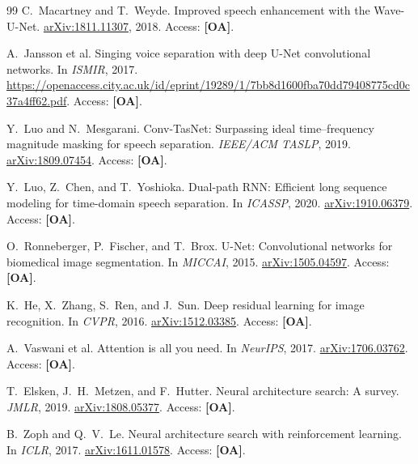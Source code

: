 \documentclass[10pt,twocolumn,letterpaper]{article}
\begin{document}
{\begin{thebibliography}{99}
C.~Macartney and T.~Weyde.
\newblock Improved speech enhancement with the Wave-U-Net.
\newblock \href{https://arxiv.org/abs/1811.11307}{arXiv:1811.11307}, 2018.
\newblock Access: \textbf{[OA]}.

A.~Jansson et al.
\newblock Singing voice separation with deep U-Net convolutional networks.
\newblock In \emph{ISMIR}, 2017.
\newblock \url{https://openaccess.city.ac.uk/id/eprint/19289/1/7bb8d1600fba70dd79408775cd0c37a4ff62.pdf}.
\newblock Access: \textbf{[OA]}.

Y.~Luo and N.~Mesgarani.
\newblock Conv-TasNet: Surpassing ideal time--frequency magnitude masking for speech separation.
\newblock \emph{IEEE/ACM TASLP}, 2019.
\newblock \href{https://arxiv.org/abs/1809.07454}{arXiv:1809.07454}.
\newblock Access: \textbf{[OA]}.

Y.~Luo, Z.~Chen, and T.~Yoshioka.
\newblock Dual-path RNN: Efficient long sequence modeling for time-domain speech separation.
\newblock In \emph{ICASSP}, 2020.
\newblock \href{https://arxiv.org/abs/1910.06379}{arXiv:1910.06379}.
\newblock Access: \textbf{[OA]}.

O.~Ronneberger, P.~Fischer, and T.~Brox.
\newblock U-Net: Convolutional networks for biomedical image segmentation.
\newblock In \emph{MICCAI}, 2015.
\newblock \href{https://arxiv.org/abs/1505.04597}{arXiv:1505.04597}.
\newblock Access: \textbf{[OA]}.

K.~He, X.~Zhang, S.~Ren, and J.~Sun.
\newblock Deep residual learning for image recognition.
\newblock In \emph{CVPR}, 2016.
\newblock \href{https://arxiv.org/abs/1512.03385}{arXiv:1512.03385}.
\newblock Access: \textbf{[OA]}.

A.~Vaswani et al.
\newblock Attention is all you need.
\newblock In \emph{NeurIPS}, 2017.
\newblock \href{https://arxiv.org/abs/1706.03762}{arXiv:1706.03762}.
\newblock Access: \textbf{[OA]}.

T.~Elsken, J.~H.~Metzen, and F.~Hutter.
\newblock Neural architecture search: A survey.
\newblock \emph{JMLR}, 2019.
\newblock \href{https://arxiv.org/abs/1808.05377}{arXiv:1808.05377}.
\newblock Access: \textbf{[OA]}.

B.~Zoph and Q.~V.~Le.
\newblock Neural architecture search with reinforcement learning.
\newblock In \emph{ICLR}, 2017.
\newblock \href{https://arxiv.org/abs/1611.01578}{arXiv:1611.01578}.
\newblock Access: \textbf{[OA]}.


\end{thebibliography}}
\end{document}
